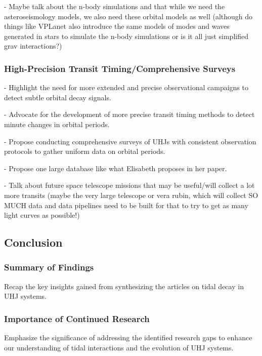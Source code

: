 \documentclass[oneside,12pt]{amsart}
\numberwithin{page}{section}
\begin{document}
- Maybe talk about the n-body simulations and that while we need the asteroseismology models, we also need these orbital models as well (although do things like VPLanet also introduce the same models of modes and waves generated in stars to simulate the n-body simulations or is it all just simplified grav interactions?)

\subsubsection{High-Precision Transit Timing/Comprehensive Surveys}
- Highlight the need for more extended and precise observational campaigns to detect subtle orbital decay signals.

- Advocate for the development of more precise transit timing methods to detect minute changes in orbital periods.

- Propose conducting comprehensive surveys of UHJs with consistent observation protocols to gather uniform data on orbital periods.

- Propose one large database like what Elisabeth proposes in her paper.

- Talk about future space telescope missions that may be useful/will collect a lot more transits (maybe the very large telescope or vera rubin, which will collect SO MUCH data and data pipelines need to be built for that to try to get as many light curves as possible!)

\clearpage 


\subsection{Conclusion}

\subsubsection{Summary of Findings}
Recap the key insights gained from synthesizing the articles on tidal decay in UHJ systems.

\subsubsection{Importance of Continued Research}
Emphasize the significance of addressing the identified research gaps to enhance our understanding of tidal interactions and the evolution of UHJ systems.

\clearpage
\end{document}
